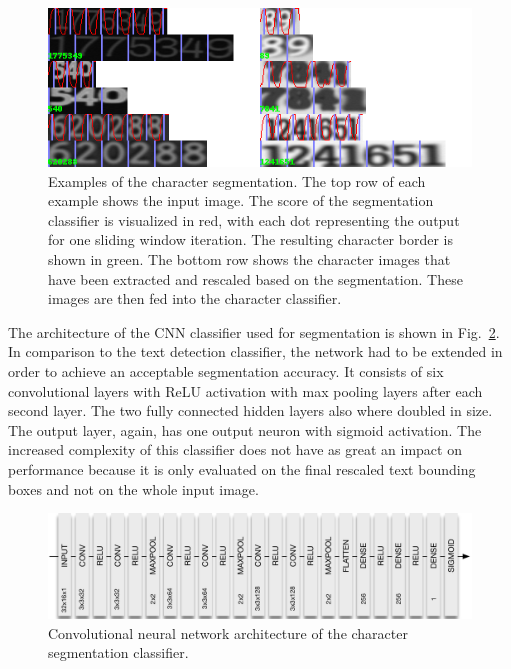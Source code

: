 \documentclass[12pt]{article}
\newcommand\figref[1]{Fig.~\ref{fig:#1}}
\begin{document}
\begin{figure}[ht]
    \centering
    \includegraphics[width=1.1\linewidth]{fig/segmentation}
    \caption{
      Examples of the character segmentation. The top row of each example shows the input
      image. The score of the segmentation classifier is visualized in red, with each dot representing
      the output for one sliding window iteration. The resulting character border is shown in green.
      The bottom row shows the character images that have been extracted and rescaled based on the
      segmentation. These images are then fed into the character classifier. }
    \label{fig:segmentation}
\end{figure}

The architecture of the CNN classifier used for segmentation is shown in \figref{segmentation_cnn}.
In comparison to the text detection classifier, the network had to be extended in order
to achieve an acceptable segmentation accuracy. It consists of six convolutional layers
with ReLU activation with max pooling layers after each second layer. The two fully connected
hidden layers also where doubled in size. The output layer, again, has one output neuron
with sigmoid activation. The increased complexity of this classifier does not have as
great an impact on performance because it is only evaluated on the final rescaled text bounding boxes
and not on the whole input image.

\begin{figure}[ht]
  \centering
  \includegraphics[scale=0.75]{fig/Segmentation_CNN}
  \caption
  {
    Convolutional neural network architecture of the character segmentation classifier.
  }
  \label{fig:segmentation_cnn}
\end{figure}
\end{document}
